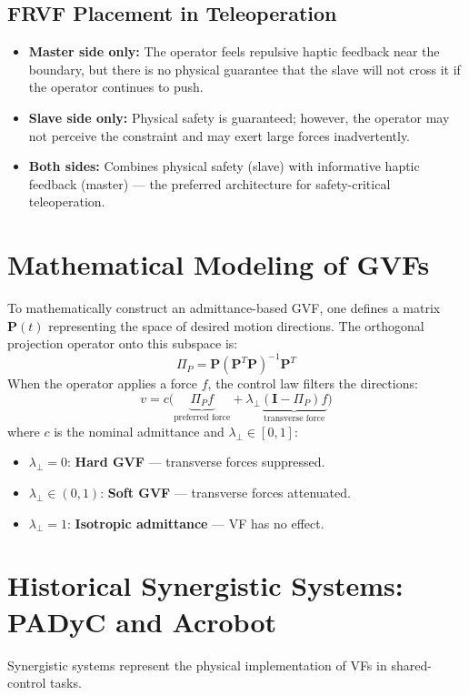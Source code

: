 \documentclass[11pt,a4paper,twoside]{report}
\begin{document}
\subsection{FRVF Placement in Teleoperation}
\begin{itemize}
    \item \textbf{Master side only:} The operator feels repulsive haptic feedback near the boundary, but there is no physical guarantee that the slave will not cross it if the operator continues to push.
    \item \textbf{Slave side only:} Physical safety is guaranteed; however, the operator may not perceive the constraint and may exert large forces inadvertently.
    \item \textbf{Both sides:} Combines physical safety (slave) with informative haptic feedback (master) — the preferred architecture for safety-critical teleoperation.
\end{itemize}

\section{Mathematical Modeling of GVFs}
To mathematically construct an admittance-based GVF, one defines a matrix $\mathbf{P}(t)$ representing the space of desired motion directions.
The orthogonal projection operator onto this subspace is:
\begin{equation}
    \Pi_P = \mathbf{P}(\mathbf{P}^T \mathbf{P})^{-1}\mathbf{P}^T
\end{equation}
When the operator applies a force $f$, the control law filters the directions:
\begin{equation}
    v = c \Big( \underbrace{\Pi_P f}_{\text{preferred force}} + \lambda_\perp \underbrace{(\mathbf{I} - \Pi_P) f}_{\text{transverse force}} \Big)
\end{equation}
where $c$ is the nominal admittance and $\lambda_\perp \in [0, 1]$:
\begin{itemize}
    \item $\lambda_\perp = 0$: \textbf{Hard GVF} — transverse forces suppressed.
    \item $\lambda_\perp \in (0,1)$: \textbf{Soft GVF} — transverse forces attenuated.
    \item $\lambda_\perp = 1$: \textbf{Isotropic admittance} — VF has no effect.
\end{itemize}

\section{Historical Synergistic Systems: PADyC and Acrobot}
Synergistic systems represent the physical implementation of VFs in shared-control tasks.
\end{document}
